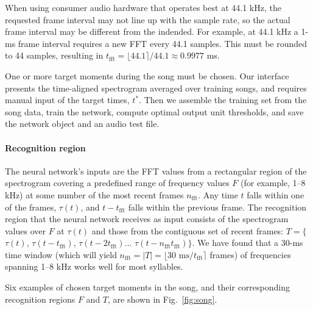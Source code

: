 \documentclass[10pt,letterpaper]{article}
\newcommand\fig[1]{Fig.~\ref{#1}}
\let\oldmarginpar\marginpar
\renewcommand{\marginpar}[1]{\oldmarginpar{\linespread{1}\scriptsize{#1}}}
\renewcommand{\subsubsection}[1]{\paragraph{#1}}
\begin{document}
When using consumer audio hardware that operates best at 44.1 kHz, the requested frame interval may not line up with the sample rate, so
the actual frame interval may be different from the indended.  For
example, at 44.1 kHz a 1-ms frame interval requires a new FFT
every 44.1 samples.  This must be rounded to 44 samples, resulting in
$t_\textrm{fft}=\lfloor 44.1 \rceil / 44.1 \approx 0.9977$ ms.

One or more target moments during the song must be chosen.  Our interface
presents the time-aligned spectrogram averaged over training songs,
and requires manual input of the target times, $t^*$.  Then we assemble the
training set from the song data, train the network, compute optimal
output unit thresholds, and save the network object and an audio test
file.

\subsubsection{Recognition region}
\label{sec:recognitionregion}

The neural network's inputs are the FFT values from a rectangular
region of the spectrogram covering a predefined range of frequency values $F$ (for example, 1--8 kHz) at
some number of the most recent frames $n_\textrm{fft}$.  Any time $t$ falls within one of the frames, $\tau(t)$, and $t-t_\textrm{fft}$ falls within the previous frame.  The recognition region that the neural network receives as input consists of the spectrogram values over $F$ at $\tau(t)$ and those from the contiguous set of recent frames: $T = \{$ $\tau(t)$, $\tau(t-t_\textrm{fft})$, $\tau(t-{2t_\textrm{fft}})\ldots$ $\tau(t-n_\textrm{fft}t_\textrm{fft})\}$.  We have found that a 30-ms time window (which will
yield $n_\textrm{fft} = |T|=\lfloor 30\textrm{ ms}/t_\textrm{fft}\rceil$ frames) of frequencies
spanning 1--8 kHz works well for most syllables.

Six examples of chosen target moments in the song, and their corresponding recognition regions $F$ and $T$, are shown in \fig{fig:song}.


\end{document}
